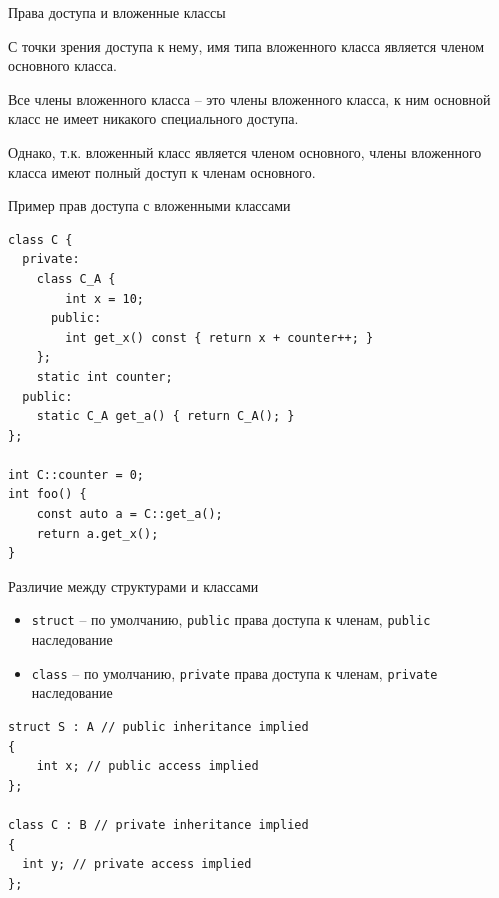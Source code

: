 \documentclass[unknownkeysallowed,xcolor=table]{beamer}
\begin{document}
\begin{frame}{Права доступа и вложенные классы}

С точки зрения доступа к нему, имя типа вложенного класса является членом основного класса.

\vspace{2em}

Все члены вложенного класса -- это члены вложенного класса, к ним основной класс не имеет никакого специального доступа.

\vspace{2em}

Однако, т.к. вложенный класс является членом основного, члены вложенного класса имеют полный доступ к членам основного.

\end{frame}

\begin{frame}[fragile]{Пример прав доступа с вложенными классами}

\begin{lstlisting}
class C {
  private:
    class C_A {
        int x = 10;
      public:
        int get_x() const { return x + counter++; }
    };
    static int counter;
  public:
    static C_A get_a() { return C_A(); }
};

int C::counter = 0;
int foo() {
    const auto a = C::get_a();
    return a.get_x();
}
\end{lstlisting}

\end{frame}

\begin{frame}[fragile]{Различие между структурами и классами}

\begin{itemize}
  \item \lstinline{struct} -- по умолчанию, \lstinline{public} права доступа к членам, \lstinline{public} наследование \vspace{0.5em}
  \item \lstinline{class} -- по умолчанию, \lstinline{private} права доступа к членам, \lstinline{private} наследование
\end{itemize}

\vspace{1em}

\begin{lstlisting}
struct S : A // public inheritance implied
{
    int x; // public access implied
};

class C : B // private inheritance implied
{
  int y; // private access implied
};
\end{lstlisting}

\end{frame}
\end{document}
